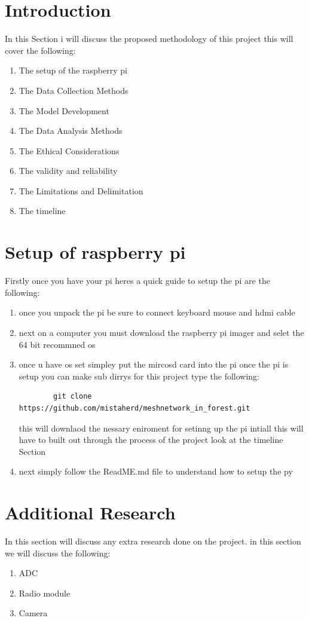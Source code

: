 
\section{Introduction}
In this  Section  i will discuss the  proposed  methodology of this  project this will cover the  following:
\begin{enumerate}
    \item The setup of the raspberry pi
    \item The Data Collection Methods
    \item The Model Development
    \item The Data Analysis Methods
    \item The Ethical Considerations
    \item The validity and reliability 
    \item The Limitations and Delimitation
    \item The timeline
\end{enumerate} 
\section{Setup of raspberry pi}
Firstly once you have  your pi  heres  a  quick  guide to setup the pi are  the following:
\begin{enumerate}
    \item once you unpack the  pi be sure  to  connect keyboard mouse  and hdmi cable
    \item next on a computer you must download the  raspberry pi imager and  selet the  64 bit  recommned os 
    \item once u have os set simpley put the  mircosd card  into  the pi once the  pi is  setup you can make sub dirrys for this project type the  following:
    \begin{verbatim}
        git clone https://github.com/mistaherd/meshnetwork_in_forest.git
    \end{verbatim}
    this  will downlaod the  nessary  eniroment for  setinng up the  pi  intiall this will have to built out  through the  process of  the   project look at the timeline Section
    \item next simply follow the ReadME.md file  to  understand  how  to setup the py
\end{enumerate}



\section{Additional  Research}
In this section will discuss any extra research done on the project.
in this section we will discuss the following:
\begin{enumerate}
    \item ADC
    \item Radio module
    \item Camera
\end{enumerate}

